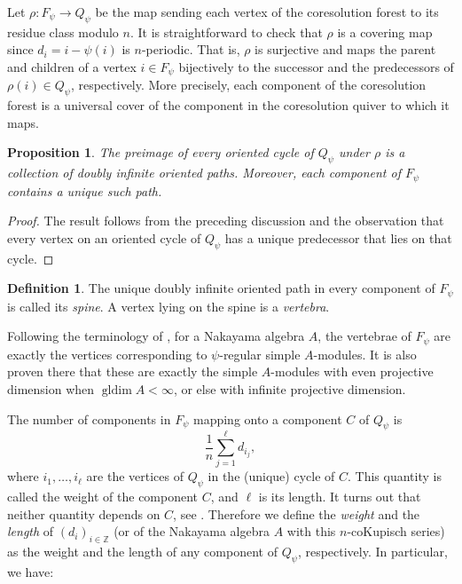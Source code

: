\documentclass[a4paper]{amsart}
\newtheorem{proposition}[theorem]{Proposition}
\theoremstyle{definition}
\newtheorem{definition}[theorem]{Definition}
\theoremstyle{remark}
\numberwithin{equation}{theorem}
\newcommand{\Dfn}[1]{\emph{\color{blue}#1}} %
\newcommand{\Z}{\mathbb{Z}}
\newcommand{\gldim}{\operatorname{gldim}}
\newcommand{\psiforest}{F_\psi}
\newcommand{\psiquiver}{Q_\psi}
\begin{document}
  Let $\rho \colon \psiforest \to \psiquiver $ be the map sending each vertex of the coresolution forest to
  its residue class modulo $n$.
  It is straightforward to check that $\rho$ is a covering map since $d_i = i-\psi(i)$ is $n$-periodic.
  That is, $\rho$ is
  surjective and maps the parent and children of a vertex $i \in \psiforest$ bijectively to the successor and the predecessors of
  $\rho(i) \in \psiquiver$, respectively. More precisely, each component of the coresolution forest is a universal
  cover of the component in the coresolution quiver to which it maps.


\begin{proposition}\label{prop:covering}
The preimage of every oriented cycle of $\psiquiver$ under $\rho$ is a collection of doubly infinite oriented paths. Moreover, each component of $\psiforest$ contains a unique such path.
\end{proposition}

\begin{proof}
The result follows from the preceding discussion and the observation that every vertex on an oriented cycle of $\psiquiver$ has a unique predecessor that lies on that cycle.
\end{proof}


\begin{definition}
    The unique doubly infinite oriented path in every component of $ \psiforest $ is called its \Dfn{spine}. A vertex lying on the spine is a \Dfn{vertebra}.
\end{definition}

Following the terminology of \cite[Section 3]{Ma}, for a Nakayama algebra $ A $, the vertebrae of $ \psiforest $ are exactly the vertices corresponding to $ \psi $-regular simple $ A $-modules. It is also proven there that these are exactly the simple $ A $-modules with even projective dimension when $ \gldim A < \infty $, or else with infinite projective dimension.

  The number of components in $ \psiforest $ mapping onto a component $ C $ of $ \psiquiver $ is
  \[
    \frac{1}{n}\sum_{j=1}^\ell d_{i_j},
  \]
  where $i_1,\dots,i_\ell$ are the vertices of $\psiquiver$ in the (unique) cycle of $ C $.  This quantity is called the weight of the component $
  C $, and $ \ell $ is its length.  It turns out that neither quantity depends on $ C $, see \cite[Proposition 1.1]{S}.  Therefore we define the \Dfn{weight} and the \Dfn{length} of $(d_i)_{i\in\Z}$ (or of the Nakayama algebra $ A $ with this $ n $-coKupisch series) as the weight and the length of any component of $\psiquiver$, respectively. In particular, we have:
\end{document}
